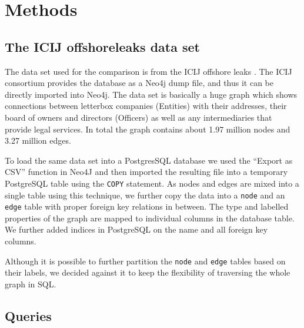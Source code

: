 \documentclass[11pt, a4paper,oneside,chapterprefix=false]{scrbook}
\begin{document}
\chapter{Methods} \label{chp:methods}


\section{The ICIJ offshoreleaks data set} \label{sec:dataset}

The data set used for the comparison is from the ICIJ offshore leaks \cite{offshoreleaks}.
The ICIJ consortium provides the database as a Neo4j dump file, and thus it can be directly imported into Neo4j.
The data set is basically a huge graph which shows connections between letterbox companies (Entities) with their addresses, their board of owners and directors (Officers) as well as any intermediaries that provide legal services. In total the graph contains about  1.97 million nodes and 3.27 million edges.

To load the same data set into a PostgresSQL database we used the ``Export as CSV'' function in Neo4J and then imported the resulting file into a temporary PostgreSQL table using the \lstinline{COPY} statement.
As nodes and edges are mixed into a single table using this technique, we further copy the data into a \lstinline{node} and an \lstinline{edge} table with proper foreign key relations in between.
The type and labelled properties of the graph are mapped to individual columns in the database table.
We further added indices in PostgreSQL on the name and all foreign key columns.

Although it is possible to further partition the \lstinline{node} and \lstinline{edge} tables based on their labels, we decided against it to keep the flexibility of traversing the whole graph in SQL.

\section{Queries} \label{sec:benchmark}
\end{document}
